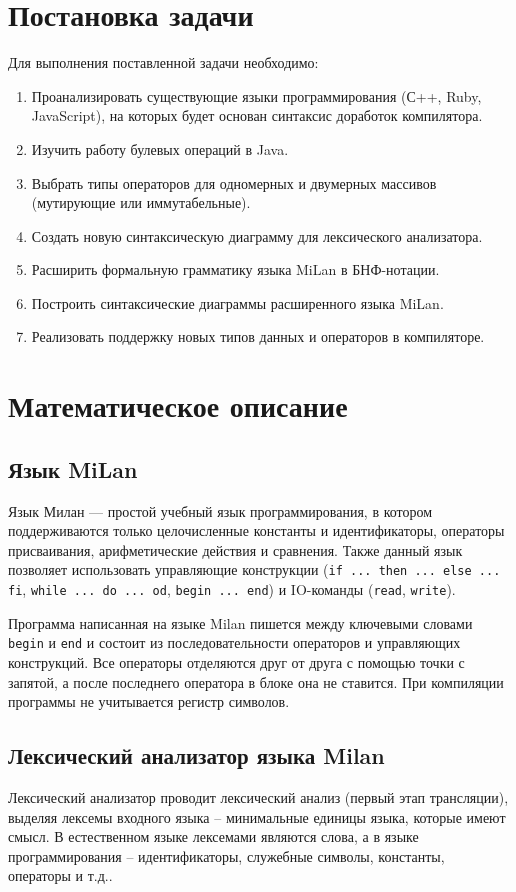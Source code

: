 \documentclass[a4paper,final]{article}
\begin{document}
\newpage
\section*{Постановка задачи}
Для выполнения поставленной задачи необходимо:
\begin{enumerate}
    \item Проанализировать существующие языки программирования (С++, Ruby, JavaScript), на которых будет основан синтаксис доработок компилятора.
    \item Изучить работу булевых операций в Java.
    \item Выбрать типы операторов для одномерных и двумерных массивов (мутирующие или иммутабельные).
    \item Создать новую синтаксическую диаграмму для лексического анализатора.
    \item Расширить формальную грамматику языка MiLan в БНФ-нотации.
    \item Построить синтаксические диаграммы расширенного языка MiLan.
    \item Реализовать поддержку новых типов данных и операторов в компиляторе.
\end{enumerate}

\newpage
\section{Математическое описание}

\subsection{Язык MiLan}
Язык Милан --- простой учебный язык программирования, в котором поддерживаются только целочисленные константы и идентификаторы, операторы присваивания, арифметические действия и сравнения. Также данный язык позволяет использовать управляющие конструкции (\texttt{if ... then ... else ... fi}, \texttt{while ... do ... od}, \texttt{begin ... end}) и IO-команды (\texttt{read}, \texttt{write}).

Программа написанная на языке Milan пишется между ключевыми словами \texttt{begin} и \texttt{end} и состоит из последовательности операторов и управляющих конструкций. Все операторы отделяются друг от друга с помощью точки с запятой, а после последнего оператора в блоке она не ставится. При компиляции программы не учитывается регистр символов.


\subsection{Лексический анализатор языка Milan}
Лексический анализатор проводит лексический анализ (первый этап трансляции), выделяя лексемы входного языка -- минимальные единицы языка, которые имеют смысл. В естественном языке лексемами являются слова, а в языке программирования -- идентификаторы, служебные символы, константы, операторы и т.д..
\end{document}
